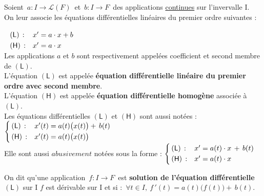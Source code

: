 Soient \(\, a:I\to \mathscr{L}(F)\, \) et \(\, b:I\to F\,\) des applications \underline{continues} sur l'invervalle I.\vspace{-0.3cm} \\
On leur associe les équations différentielles linéaires du premier ordre suivantes :\(\; \begin{array}{ll}
    & \\
    (\mathsf{L})\, : & x'=a\cdot x+b\vspace{0.1cm} \\
    (\mathsf{H})\,: & x'=a\cdot x
\end{array}\)\vspace{0.4cm} \\
Les applications $a$ et $b$ sont respectivement appelées coefficient et second membre de \((\mathsf{L})\).\vspace{0.1cm}\\
L'équation $(\mathsf{L})$ est appelée \textbf{équation différentielle linéaire du premier ordre avec second membre}.\vspace{0.1cm}\\
L'équation $(\mathsf{H})$ est appelée \textbf{équation différentielle homogène} associée à $(\mathsf{L})$.\vspace{0.4cm}\\
Les équations différentielles $(\mathsf{L})$ et $(\mathsf{H})$ sont aussi notées : \(
\left\{\!\!\begin{array}{ll}
    (\mathsf{L})\,: & x'(t)=a(t)\bigl(x(t)\bigr)+\,b(t)\vspace{0.1cm}\\
    (\mathsf{H})\,: & x'(t)=a(t)\bigl(x(t)\bigr)
\end{array}\right.\)\vspace{0.5cm}\\
Elle sont aussi $abusivement$ notées sous la forme : \(
    \left\{\!\!\begin{array}{ll}
        (\mathsf{L})\,: & x'=a(t)\cdot x\,+\,b(t)\vspace{0.1cm}\\
        (\mathsf{H})\,: & x'=a(t)\cdot x
    \end{array}\right.\)

\vspace{2cm}

On dit qu'une application \(\,f:I\to F\,\) est \textbf{solution de l'équation différentielle} $(\mathsf{L})$ sur I \ssi $f$ est dérivable sur I et si : \(\, \forall t\in I,\ f\,'(t)=a(t)\bigl(f(t)\bigr)+\,b(t).\)

